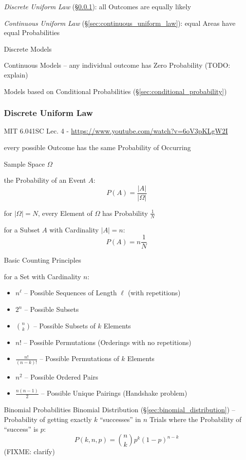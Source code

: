 \emph{Discrete Uniform Law} (\S\ref{sec:discrete_uniform_law}): all Outcomes are
equally likely

\emph{Continuous Uniform Law} (\S\ref{sec:continuous_uniform_law}): equal Areas
have equal Probabilities

Discrete Models

Continuous Models -- any individual outcome has Zero Probability (TODO: explain)

Models based on Conditional Probabilities (\S\ref{sec:conditional_probability})



\subsubsection{Discrete Uniform Law}\label{sec:discrete_uniform_law}

MIT 6.041SC Lec. 4 - \url{https://www.youtube.com/watch?v=6oV3pKLgW2I}

every possible Outcome has the same Probability of Occurring

Sample Space $\Omega$

the Probability of an Event $A$:
\[
  P(A) = \frac{|A|}{|\Omega|}
\]

for $|\Omega| = N$, every Element of $\Omega$ has Probability $\frac{1}{N}$

for a Subset $A$ with Cardinality $|A| = n$:
\[
  P(A) = n \frac{1}{N}
\]


Basic Counting Principles

for a Set with Cardinality $n$:
\begin{itemize}
  \item $n^\ell$ -- Possible Sequences of Length $\ell$ (with repetitions)
  \item $2^n$ -- Possible Subsets
  \item $\binom{n}{k}$ -- Possible Subsets of $k$ Elements
  \item $n!$ -- Possible Permutations (Orderings with no repetitions)
  \item $\frac{n!}{(n-k)!}$ -- Possible Permutations of $k$ Elements
  \item $n^2$ -- Possible Ordered Pairs
  \item $\frac{n(n-1)}{2}$ -- Possible Unique Pairings (Handshake problem)
\end{itemize}


Binomial Probabilities \fist Binomial Distribution
(\S\ref{sec:binomial_distribution}) -- Probability of getting exactly $k$
``successes'' in $n$ Trials where the Probability of ``success'' is $p$:
\[
  P(k,n,p) = \binom{n}{k}p^k(1-p)^{n-k}
\]
(FIXME: clarify)



